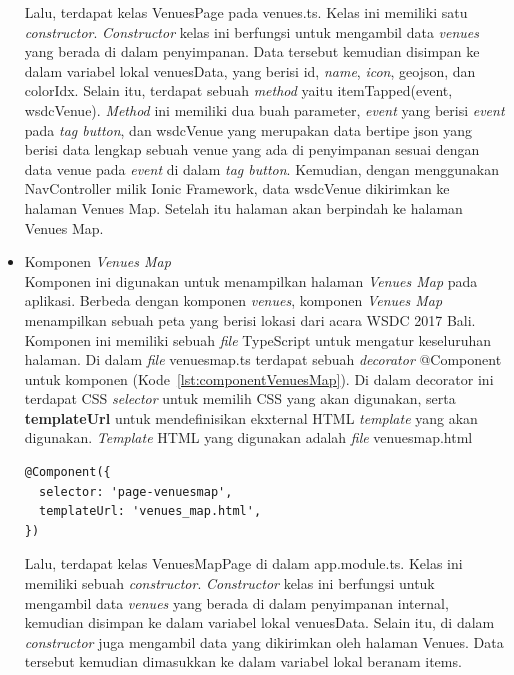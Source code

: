 \begin{itemize}
	Lalu, terdapat kelas VenuesPage pada venues.ts. Kelas ini memiliki satu \textit{constructor}. \textit{Constructor} kelas ini berfungsi untuk mengambil data \textit{venues} yang berada di dalam penyimpanan. Data tersebut kemudian disimpan ke dalam variabel lokal venuesData, yang berisi id, \textit{name}, \textit{icon}, geojson, dan colorIdx. 
	Selain itu, terdapat sebuah \textit{method} yaitu itemTapped(event, wsdcVenue). \textit{Method} ini memiliki dua buah parameter, \textit{event} yang berisi \textit{event} pada \textit{tag button}, dan wsdcVenue yang merupakan data bertipe json yang berisi data lengkap sebuah venue yang ada di penyimpanan sesuai dengan data venue pada \textit{event} di dalam \textit{tag button}. Kemudian, dengan menggunakan NavController milik Ionic Framework, data wsdcVenue dikirimkan ke halaman Venues Map. Setelah itu halaman akan berpindah ke halaman Venues Map.
	
	\item Komponen \textit{Venues Map} \\
	Komponen ini digunakan untuk menampilkan halaman \textit{Venues Map} pada aplikasi. Berbeda dengan komponen \textit{venues}, komponen \textit{Venues Map} menampilkan sebuah peta yang berisi lokasi dari acara WSDC 2017 Bali. Komponen ini memiliki sebuah \textit{file} TypeScript untuk mengatur keseluruhan halaman. Di dalam \textit{file} venues\textunderscore map.ts terdapat sebuah \textit{decorator} @Component untuk komponen (Kode~\ref{lst:componentVenuesMap}). Di dalam decorator ini terdapat CSS \textit{selector} untuk memilih CSS yang akan digunakan, serta \textbf{templateUrl} untuk mendefinisikan ekxternal HTML \textit{template} yang akan digunakan. \textit{Template} HTML yang digunakan adalah \textit{file} venues\textunderscore map.html
	
\begin{lstlisting}[language=html, label={lst:componentVenuesMap}, caption=@Component pada venues\textunderscore map.ts]
@Component({
  selector: 'page-venuesmap',
  templateUrl: 'venues_map.html',
})
\end{lstlisting}	

	Lalu, terdapat kelas VenuesMapPage di dalam app.module.ts. Kelas ini memiliki sebuah \textit{constructor}. \textit{Constructor} kelas ini berfungsi untuk mengambil data \textit{venues} yang berada di dalam penyimpanan internal, kemudian disimpan ke dalam variabel lokal venuesData. Selain itu, di dalam \textit{constructor} juga mengambil data yang dikirimkan oleh halaman Venues. Data tersebut kemudian dimasukkan ke dalam variabel lokal beranam items. 
	

\end{itemize}
